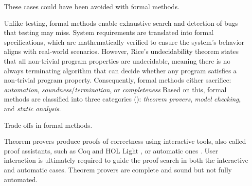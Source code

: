 These cases could have been avoided with formal methods.

Unlike testing, formal methods enable exhaustive search and detection of bugs that testing may miss.
System requirements are translated into formal specifications, which are mathematically verified to ensure the system's behavior aligns with real-world scenarios.
However, Rice's undecidability theorem  states that all non-trivial program properties are undecidable, meaning there is no always terminating algorithm that can decide whether any program satisfies a non-trivial program property.
Consequently, formal methods either sacrifice: \emph{automation}, \emph{soundness}/\emph{termination}, or \emph{completeness}
Based on this, formal methods are classified into three categories  (): \emph{theorem provers}, \emph{model checking}, and \emph{static analysis}.

\begin{marginfigure}
  \caption{Trade-offs in formal methods.}
\end{marginfigure}

Theorem provers  produce proofs of correctness using interactive tools, also called proof assistants, such as Coq  and HOL Light , or automatic ones .
User interaction is ultimately required to guide the proof search in both the interactive and automatic cases.
Theorem provers are complete and sound but not fully automated.

